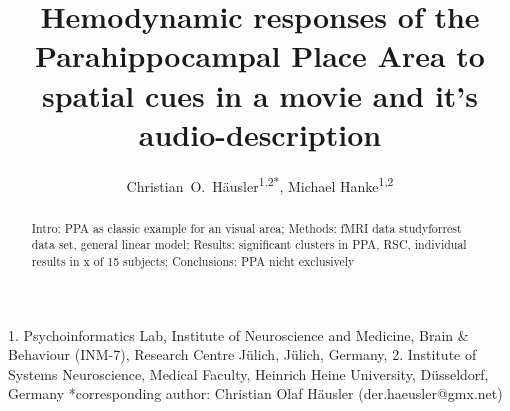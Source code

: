 \documentclass[english]{article}
\begin{document}




\title{Hemodynamic responses of the Parahippocampal Place Area to spatial cues in a movie and it's audio-description}

\author{Christian~O.~Häusler\textsuperscript{1,2{*}}, Michael Hanke\textsuperscript{1,2}}

\maketitle
\thispagestyle{fancy}

1. Psychoinformatics Lab, Institute of Neuroscience and Medicine, Brain \&
Behaviour (INM-7), Research Centre Jülich, Jülich, Germany,
2. Institute of Systems Neuroscience, Medical Faculty, Heinrich Heine University,  Düsseldorf, Germany
{*}corresponding author: Christian Olaf Häusler (der.haeusler@gmx.net)

\begin{abstract}
Intro: PPA as classic example for an visual area; Methods: fMRI data
studyforrest data set, general linear model; Results: significant clusters in
PPA, RSC, individual results in x of 15 subjects; Conclusions: PPA nicht
exclusively \end{abstract}



\end{document}
